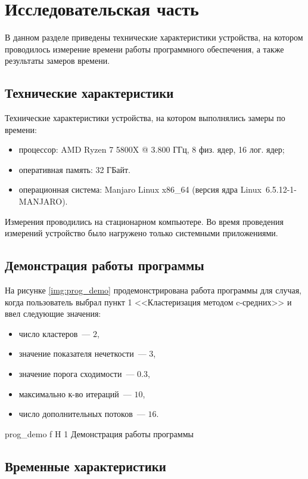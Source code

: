 \chapter{Исследовательская часть}

В данном разделе приведены технические характеристики устройства, на котором проводилось измерение времени работы программного обеспечения, а также результаты замеров времени.

\section{Технические характеристики}

Технические характеристики устройства, на котором выполнялись замеры по времени:

\begin{itemize}
	\item процессор: AMD Ryzen 7 5800X @ 3.800 ГГц, 8 физ. ядер, 16 лог. ядер;
	\item оперативная память: 32 ГБайт.
	\item операционная система: Manjaro Linux x86\_64 (версия ядра Linux~6.5.12-1-MANJARO).
\end{itemize}

Измерения проводились на стационарном компьютере.
Во время проведения измерений устройство было нагружено только системными приложениями.

\section{Демонстрация работы программы}

На рисунке \ref{img:prog_demo} продемонстрирована работа программы для случая, когда пользователь выбрал пункт 1 <<Кластеризация методом c-средних>> и ввел следующие значения:
\begin{itemize}
	\item число кластеров~--- $2$,
	\item значение показателя нечеткости~--- $3$,
	\item значение порога сходимости~--- $0.3$,
	\item максимально к-во итераций~--- $10$,
	\item число дополнительных потоков~--- $16$.
\end{itemize}

	{prog_demo}
	{f}
	{H}
	{1\textwidth}
	{Демонстрация работы программы}

\section{Временные характеристики}

